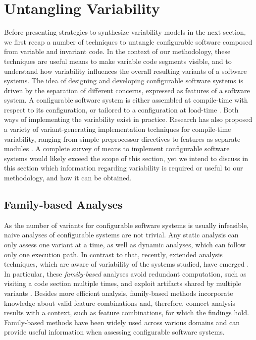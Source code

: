 \section{Untangling Variability}\label{sec:untangling}
Before presenting strategies to synthesize variability models in
the next section, we first recap a number of techniques to untangle configurable
software composed from variable and invariant code. In the context of our
methodology, these techniques are useful means to make variable code segments
visible, and to understand how variability influences the overall resulting
variants of a software systems.
The idea of designing and developing configurable software systems is driven by
the separation of different concerns, expressed as features of a software
system. A configurable software system is either assembled at compile-time with
respect to its configuration, or tailored to a configuration at
load-time \citep{apel_feature-oriented_2013}. Both ways of implementing the
variability exist in practice.
Research has also proposed a variety of variant-generating implementation techniques for
compile-time variability, ranging from simple preprocessor directives to
features as separate modules \citep{kastner_model_2009}.  A complete survey of means to implement
configurable software systems would likely exceed the scope of this section, yet we intend to discuss in this
section which information regarding variability is required or useful to our
methodology, and how it can be obtained.

\subsection{Family-based Analyses}
As the number of variants for configurable software systems is usually
infeasible, naive analyses of configurable systems are not trivial. Any static
analysis can only assess one variant at a time, as well as dynamic analyses,
which can follow only one execution path. 
In contrast to that, recently,
extended analysis techniques, which are aware of variability of the systems
studied, have emerged \citep{thum_classification_2014}. In particular, these
\emph{family-based} analyses avoid redundant computation, such as visiting a
code section multiple times, and exploit artifacts shared by multiple variants
\citep{thum_classification_2014}. Besides more efficient analysis, family-based
methods incorporate knowledge about valid feature combinations
\citep{thum_classification_2014} and, therefore, connect analysis results with
a context, such as feature combinations, for which the findings hold.
Family-based methods have been widely used across various domains and can
provide useful information when assessing configurable software systems.


